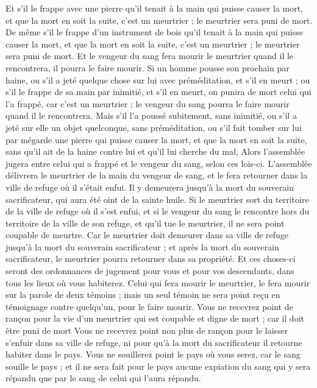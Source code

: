 \begin{multicols}{2}
Et s’il le frappe avec une pierre qu’il tenait à la main qui puisse causer la mort, et que la mort en soit la suite, c'est un meurtrier ; le meurtrier sera puni de mort.
De même s’il le frappe d’un instrument de bois qu’il tenait à la main qui puisse causer la mort, et que la mort en soit la suite, c'est un meurtrier ; le meurtrier sera puni de mort.
Et le vengeur du sang fera mourir le meurtrier quand il le rencontrera, il pourra le faire mourir.
Si un homme pousse son prochain par haine, ou s'il a jeté quelque chose sur lui avec préméditation, et s'il en meurt ;
ou s’il le frappe de sa main par inimitié, et s'il en meurt, on punira de mort celui qui l'a frappé, car c’est un meurtrier ; le vengeur du sang pourra le faire mourir quand il le rencontrera.
Mais s'il l'a poussé subitement, sans inimitié, ou s'il a jeté sur elle un objet quelconque, sans préméditation,
ou s’il fait tomber sur lui par mégarde une pierre qui puisse causer la mort, et que la mort en soit la suite, sans qu'il ait de la haine contre lui et qu’il lui cherche du mal,
Alors l'assemblée jugera entre celui qui a frappé et le vengeur du sang, selon ces lois-ci.
L'assemblée délivrera le meurtrier de la main du vengeur de sang, et le fera retourner dans la ville de refuge où il s'était enfui. Il y demeurera jusqu'à la mort du souverain sacrificateur, qui aura été oint de la sainte huile.
Si le meurtrier sort du territoire de la ville de refuge où il s'est enfui,
et si le vengeur du sang le rencontre hors du territoire de la ville de son refuge, et qu'il tue le meurtrier, il ne sera point coupable de meurtre.
Car le meurtrier doit demeurer dans sa ville de refuge jusqu'à la mort du souverain sacrificateur ; et après la mort du souverain sacrificateur, le meurtrier pourra retourner dans sa propriété.
Et ces choses-ci seront des ordonnances de jugement pour vous et pour vos descendants, dans tous les lieux où vous habiterez.
Celui qui fera mourir le meurtrier, le fera mourir sur la parole de deux témoins ; mais un seul témoin ne sera point reçu en témoignage contre quelqu'un, pour le faire mourir.
Vous ne recevrez point de rançon pour la vie d'un meurtrier qui est coupable et digne de mort ; car il doit être puni de mort
Vous ne recevrez point non plus de rançon pour le laisser s’enfuir dans sa ville de refuge, ni pour qu'à la mort du sacrificateur il retourne habiter dans le pays.
Vous ne souillerez point le pays où vous serez, car le sang souille le pays ; et il ne sera fait pour le pays aucune expiation du sang qui y sera répandu que par le sang de celui qui l'aura répandu.

\end{multicols}
